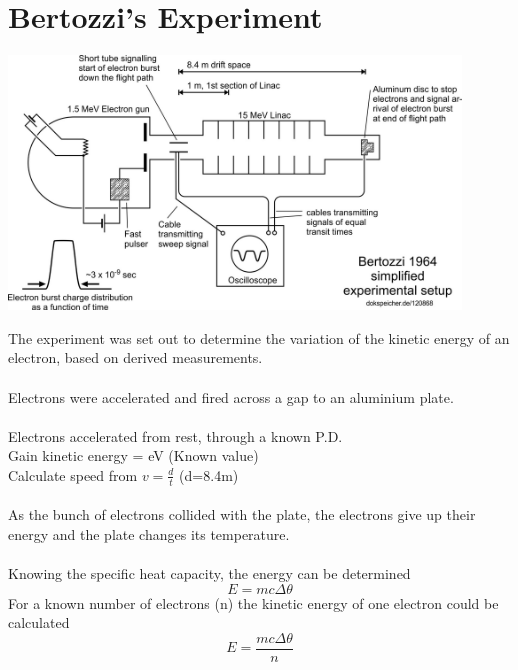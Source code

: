 \documentclass[12pt]{article}
\begin{document}
\section{Bertozzi's Experiment}
\begin{center}
\includegraphics[width=12cm]{Bertozzi.jpg}
\end{center}
The experiment was set out to determine the variation of the kinetic energy of an electron, based on derived measurements.\\
\\
Electrons were accelerated and fired across a gap to an aluminium plate.\\
\\
Electrons accelerated from rest, through a known P.D.\\
Gain kinetic energy = eV (Known value)\\
Calculate speed from $v=\frac{d}{t}$ (d=8.4m)\\
\\
As the bunch of electrons collided with the plate, the electrons give up their energy and the plate changes its temperature.\\
\\
Knowing the specific heat capacity, the energy can be determined
$$E=mc\Delta\theta$$
For a known number of electrons (n) the kinetic energy of one electron could be calculated
$$E=\frac{mc\Delta\theta}{n}$$
\end{document}
